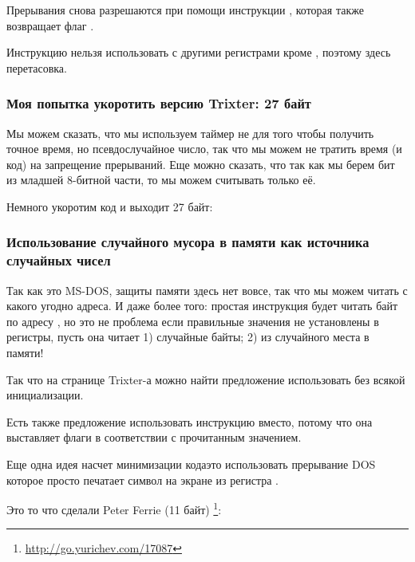 Прерывания снова разрешаются при помощи инструкции , которая
также возвращает флаг .

Инструкцию  нельзя использовать с другими регистрами кроме , поэтому здесь перетасовка.

\subsubsection{Моя попытка укоротить версию Trixter: 27 байт}

Мы можем сказать, что мы используем таймер не для того чтобы получить точное время, но псевдослучайное число,
так что мы можем не тратить время (и код) на запрещение прерываний.
Еще можно сказать, что так как мы берем бит из младшей 8-битной части, то мы можем считывать только её.

Немного укоротим код и выходит 27 байт:



\subsubsection{Использование случайного мусора в памяти как источника случайных чисел}

Так как это MS-DOS, защиты памяти здесь нет вовсе, так что мы можем читать с какого
угодно адреса.
И даже более того: простая инструкция  
будет читать байт по адресу , но это не проблема
если правильные значения не установлены в регистры, пусть она читает 1) случайные байты; 2) из случайного
места в памяти!

Так что на странице Trixter-а\FNURLTRIXTER 
можно найти предложение использовать  без всякой инициализации.

Есть также предложение использовать инструкцию  
вместо, потому что она выставляет флаги в соответствии с прочитанным значением.

Еще одна идея насчет минимизации кода\EMDASH{}это использовать прерывание DOS
  которое просто печатает символ на экране
из регистра .

Это то что сделали Peter Ferrie \AndENRU \HERMIT{} (11  байт)
\footnote{\url{http://go.yurichev.com/17087}}:



